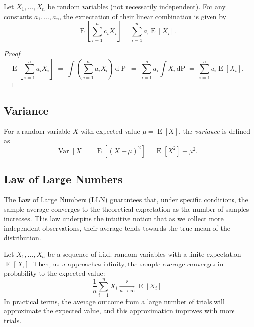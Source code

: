 \documentclass[11pt, headings=standardclasses, parskip=half, twoside]{scrartcl}
\begin{document}
\begin{theorem}{}
    Let $X_{1}, \ldots, X_{n}$ be random variables (not necessarily independent). For any constants $a_{1}, \ldots, a_{n}$, the expectation of their linear combination is given by
    \[
    \operatorname{E}\left[\sum_{i=1}^{n} a_{i} X_{i}\right]=\sum_{i=1}^{n} a_{i} \operatorname{E}\left[X_{i}\right].
    \]
\end{theorem}

\begin{proof}
    \[
      \operatorname{E}\left[\sum_{i=1}^{n} a_i X_i\right]
      \;=\;
      \int \left(\sum_{i=1}^{n} a_i X_i\right)\,\mathrm{d}\operatorname{P}
        \;=\;
        \sum_{i=1}^n a_i \int X_i \,\mathrm{d}\mathrm{P}
        \;=\;
        \sum_{i=1}^n a_i \operatorname{E}[X_i].
    \]
\end{proof}


\subsection{Variance}
\begin{definition}[Variance]{}
    For a random variable $X$ with expected value $\mu = \operatorname{E}[X]$, the \emph{variance} is defined as
    \[
    \operatorname{Var}[X]=\operatorname{E}\left[(X-\mu)^{2}\right]=\operatorname{E}[X^{2}]-\mu^{2} \text{.}
    \]
\end{definition}



\subsection{Law of Large Numbers}

The Law of Large Numbers (LLN) guarantees that, under specific conditions, the sample average converges to the theoretical expectation as the number of samples increases. This law underpins the intuitive notion that as we collect more independent observations, their average tends towards the true mean of the distribution.
\begin{theorem}{}
    \label{thm:lln}
    Let $X_{1}, \ldots, X_{n}$ be a sequence of i.i.d. random variables with a finite expectation $\operatorname{E}[X_{i}]$. Then, as $n$ approaches infinity, the sample average converges in probability to the expected value:
    \[
    \frac{1}{n} \sum_{i=1}^{n} X_{i} \xrightarrow[n \rightarrow \infty]{p} \operatorname{E}[X_{i}]
    \]
    In practical terms, the average outcome from a large number of trials will approximate the expected value, and this approximation improves with more trials.
\end{theorem}
\end{document}
